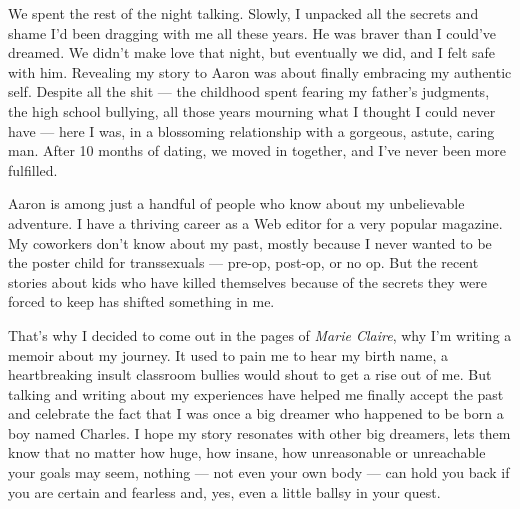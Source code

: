 \documentclass{article}
\begin{document}
We spent the rest of the night talking. Slowly, I unpacked all the secrets and
shame I'd been dragging with me all these years. He was braver than I could've
dreamed. We didn't make love that night, but eventually we did, and I felt safe
with him. Revealing my story to Aaron was about finally embracing my authentic
self. Despite all the shit --- the childhood spent fearing my father's
judgments, the high school bullying, all those years mourning what I thought I
could never have --- here I was, in a blossoming relationship with a gorgeous,
astute, caring man. After 10 months of dating, we moved in together, and I've
never been more fulfilled.

Aaron is among just a handful of people who know about my unbelievable
adventure. I have a thriving career as a Web editor for a very popular
magazine. My coworkers don't know about my past, mostly because I never wanted
to be the poster child for transsexuals --- pre-op, post-op, or no op. But the
recent stories about kids who have killed themselves because of the secrets
they were forced to keep has shifted something in me.

That's why I decided to come out in the pages of \emph{Marie Claire}, why I'm
writing a memoir about my journey. It used to pain me to hear my birth name, a
heartbreaking insult classroom bullies would shout to get a rise out of me. But
talking and writing about my experiences have helped me finally accept the past
and celebrate the fact that I was once a big dreamer who happened to be born a
boy named Charles. I hope my story resonates with other big dreamers, lets them
know that no matter how huge, how insane, how unreasonable or unreachable your
goals may seem, nothing --- not even your own body --- can hold you back if you
are certain and fearless and, yes, even a little ballsy in your quest.
\end{document}
